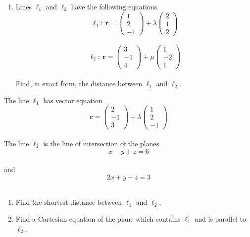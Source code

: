 \documentclass[leqno]{article}
\begin{document}
\begin{enumerate}[
  label=\textbf{\arabic*.},
  leftmargin=*,
  topsep=0pt,
  partopsep=0pt,
  parsep=0pt
]
\begin{enumerate}[label=\textbf{(\alph*)}]
  The point $D$ has coordinates $(4,1,0)$. Find the shortest distance between $D$ and $\Pi$.  \\
  \item Lines $\ell_1$ and $\ell_2$ have the following equations. \\
  \[
  \ell_1:\ \mathbf{r}=\begin{pmatrix}1\\2\\-1\end{pmatrix}+\lambda\begin{pmatrix}2\\1\\2\end{pmatrix}
  \] \\
  \[
  \ell_2:\ \mathbf{r}=\begin{pmatrix}3\\-1\\4\end{pmatrix}+\mu\begin{pmatrix}1\\-2\\1\end{pmatrix}
  \] \\
  Find, in exact form, the distance between $\ell_1$ and $\ell_2$.  \\
\end{enumerate}

\newpage

\questionitem

The line $\ell_1$ has vector equation
\[
\mathbf{r}=\begin{pmatrix}2\\-1\\3\end{pmatrix}+\lambda\begin{pmatrix}1\\2\\-1\end{pmatrix}
\] \\
The line $\ell_2$ is the line of intersection of the planes
\[
x-y+z=6
\] \\
and
\[
2x+y-z=3
\] \\
\begin{enumerate}[label=\textbf{(\roman*)}]
  \item Find the shortest distance between $\ell_1$ and $\ell_2$.  \\
  \item Find a Cartesian equation of the plane which contains $\ell_1$ and is parallel to $\ell_2$.  \\
\end{enumerate}


\end{enumerate}
\end{document}
